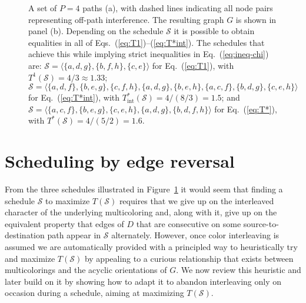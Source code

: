 \documentclass{article}
\begin{document}
\begin{figure}[t]
\centering
{}
\caption{A set of $P=4$ paths (a), with dashed lines indicating all node pairs
representing off-path interference. The resulting graph $G$ is shown in panel
(b). Depending on the schedule $\mathcal{S}$ it is possible to obtain equalities
in all of Eqs.~(\ref{eq:T1})--(\ref{eq:T*int}). The schedules that achieve this
while implying strict inequalities in Eq.~(\ref{eq:ineq-chi}) are:
$\mathcal{S}=\langle\{a,d,g\},\allowbreak
\{b,f,h\},\allowbreak
\{c,e\}\rangle$ for Eq.~(\ref{eq:T1}),
with $T^1(\mathcal{S})=4/3\approx 1.33$;
$\mathcal{S}=\langle\{a,d,f\},\allowbreak
\{b,e,g\},\allowbreak
\{c,f,h\},\allowbreak
\{a,d,g\},\allowbreak
\{b,e,h\},\allowbreak
\{a,c,f\},\allowbreak
\{b,d,g\},\allowbreak
\{c,e,h\}\rangle$
for Eq.~(\ref{eq:T*int}), with $T^*_\mathrm{int}(\mathcal{S})=4/(8/3)=1.5$; and
$\mathcal{S}=\langle\{a,c,f\},\allowbreak
\{b,e,g\},\allowbreak
\{c,e,h\},\allowbreak
\{a,d,g\},\allowbreak
\{b,d,f,h\}\rangle$ 
for Eq.~(\ref{eq:T*}), with $T^*(\mathcal{S})=4/(5/2)=1.6$.}
\label{fig4}
\end{figure}

\section{Scheduling by edge reversal}\label{sec:ser}

From the three schedules illustrated in Figure~\ref{fig4} it would seem that
finding a schedule $\mathcal{S}$ to maximize $T(\mathcal{S})$ requires that we
give up on the interleaved character of the underlying multicoloring and, along
with it, give up on the equivalent property that edges of $D$ that are
consecutive on some source-to-destination path appear in $\mathcal{S}$
alternately. However, once color interleaving is assumed we are automatically
provided with a principled way to heuristically try and maximize
$T(\mathcal{S})$ by appealing to a curious relationship that exists between
multicolorings and the acyclic orientations of $G$. We now review this heuristic
and later build on it by showing how to adapt it to abandon interleaving only on
occasion during a schedule, aiming at maximizing $T(\mathcal{S})$.
\end{document}
